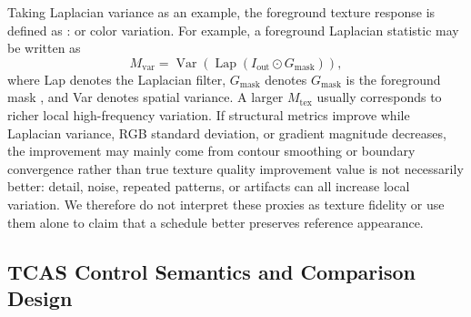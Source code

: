 \documentclass[times,twocolumn,final]{elsarticle}
\providecommand{\DIFadd}[1]{{\protect\color{blue} \sf #1}} %
\providecommand{\DIFdel}[1]{{\protect\color{red} \scriptsize #1}} %
\providecommand{\DIFaddbegin}{} %
\providecommand{\DIFaddend}{} %
\providecommand{\DIFdelbegin}{} %
\providecommand{\DIFdelend}{} %
\begin{document}
\DIFdel{Taking Laplacian variance as an example, the foreground texture response is defined as
:
}%
\DIFdelend \DIFaddbegin \DIFadd{or color variation. For example, a foreground Laplacian statistic may be written as
}\begin{equation}
M_{\mathrm{var}}=\operatorname{Var}\!\left(\operatorname{Lap}(I_{\mathrm{out}}\odot G_{\mathrm{mask}})\right),
\end{equation}\DIFaddend 
where \DIFdelbegin \DIFdel{Lap denotes the Laplacian filter, $G_\text{mask}$ denotes }\DIFdelend \DIFaddbegin \DIFadd{$G_{\mathrm{mask}}$ is }\DIFaddend the foreground mask\DIFdelbegin \DIFdel{, and Var denotes spatial variance}\DIFdelend . A larger \DIFdelbegin \DIFdel{$M_\text{tex}$ usually corresponds to richer local high-frequency variation. If structural metrics improve while Laplacian variance, RGB standard deviation, or gradient magnitude decreases, the improvement may mainly come from contour smoothing or boundary convergence rather than true texture quality improvement}\DIFdelend \DIFaddbegin \DIFadd{value is not necessarily better: detail, noise, repeated patterns, or artifacts can all increase local variation. We therefore do not interpret these proxies as texture fidelity or use them alone to claim that a schedule better preserves reference appearance}\DIFaddend .

\DIFdelbegin %
\DIFdelend \DIFaddbegin \subsection{TCAS Control Semantics and Comparison Design}
\DIFaddend \label{subsec:tcas}
\end{document}

